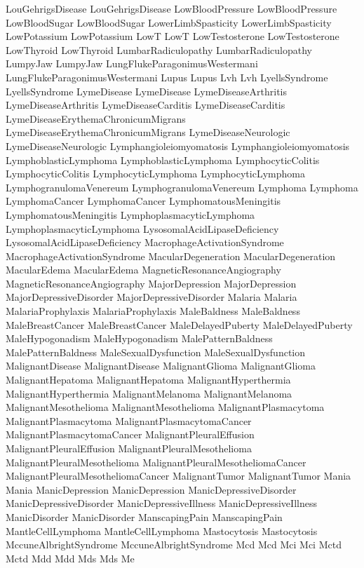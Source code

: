  LouGehrigsDisease
 LouGehrigsDisease
 LowBloodPressure
 LowBloodPressure
 LowBloodSugar
 LowBloodSugar
 LowerLimbSpasticity
 LowerLimbSpasticity
 LowPotassium
 LowPotassium
 LowT
 LowT
 LowTestosterone
 LowTestosterone
 LowThyroid
 LowThyroid
 LumbarRadiculopathy
 LumbarRadiculopathy
 LumpyJaw
 LumpyJaw
 LungFlukeParagonimusWestermani
 LungFlukeParagonimusWestermani
 Lupus
 Lupus
 Lvh
 Lvh
 LyellsSyndrome
 LyellsSyndrome
 LymeDisease
 LymeDisease
 LymeDiseaseArthritis
 LymeDiseaseArthritis
 LymeDiseaseCarditis
 LymeDiseaseCarditis
 LymeDiseaseErythemaChronicumMigrans
 LymeDiseaseErythemaChronicumMigrans
 LymeDiseaseNeurologic
 LymeDiseaseNeurologic
 Lymphangioleiomyomatosis
 Lymphangioleiomyomatosis
 LymphoblasticLymphoma
 LymphoblasticLymphoma
 LymphocyticColitis
 LymphocyticColitis
 LymphocyticLymphoma
 LymphocyticLymphoma
 LymphogranulomaVenereum
 LymphogranulomaVenereum
 Lymphoma
 Lymphoma
 LymphomaCancer
 LymphomaCancer
 LymphomatousMeningitis
 LymphomatousMeningitis
 LymphoplasmacyticLymphoma
 LymphoplasmacyticLymphoma
 LysosomalAcidLipaseDeficiency
 LysosomalAcidLipaseDeficiency
 MacrophageActivationSyndrome
 MacrophageActivationSyndrome
 MacularDegeneration
 MacularDegeneration
 MacularEdema
 MacularEdema
 MagneticResonanceAngiography
 MagneticResonanceAngiography
 MajorDepression
 MajorDepression
 MajorDepressiveDisorder
 MajorDepressiveDisorder
 Malaria
 Malaria
 MalariaProphylaxis
 MalariaProphylaxis
 MaleBaldness
 MaleBaldness
 MaleBreastCancer
 MaleBreastCancer
 MaleDelayedPuberty
 MaleDelayedPuberty
 MaleHypogonadism
 MaleHypogonadism
 MalePatternBaldness
 MalePatternBaldness
 MaleSexualDysfunction
 MaleSexualDysfunction
 MalignantDisease
 MalignantDisease
 MalignantGlioma
 MalignantGlioma
 MalignantHepatoma
 MalignantHepatoma
 MalignantHyperthermia
 MalignantHyperthermia
 MalignantMelanoma
 MalignantMelanoma
 MalignantMesothelioma
 MalignantMesothelioma
 MalignantPlasmacytoma
 MalignantPlasmacytoma
 MalignantPlasmacytomaCancer
 MalignantPlasmacytomaCancer
 MalignantPleuralEffusion
 MalignantPleuralEffusion
 MalignantPleuralMesothelioma
 MalignantPleuralMesothelioma
 MalignantPleuralMesotheliomaCancer
 MalignantPleuralMesotheliomaCancer
 MalignantTumor
 MalignantTumor
 Mania
 Mania
 ManicDepression
 ManicDepression
 ManicDepressiveDisorder
 ManicDepressiveDisorder
 ManicDepressiveIllness
 ManicDepressiveIllness
 ManicDisorder
 ManicDisorder
 ManscapingPain
 ManscapingPain
 MantleCellLymphoma
 MantleCellLymphoma
 Mastocytosis
 Mastocytosis
 MccuneAlbrightSyndrome
 MccuneAlbrightSyndrome
 Mcd
 Mcd
 Mci
 Mci
 Mctd
 Mctd
 Mdd
 Mdd
 Mds
 Mds
 Me
